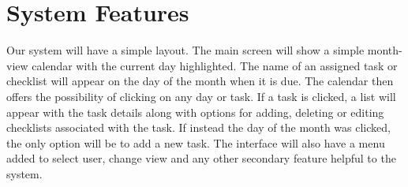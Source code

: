 \documentclass{article}
\begin{document}
\newpage
\section{System Features}
Our system will have a simple layout.
The main screen will show a simple month-view calendar with the current day highlighted. 
The name of an assigned task or checklist will appear on the day of the month when it is due. 
The calendar then offers the possibility of clicking on any day or task.
If a task is clicked, a list will appear with the task details along with options for adding, deleting or editing checklists associated with the task. 
If instead the day of the month was clicked, the only option will be to add a new task. 
The interface will also have a menu added to select user, change view and any other secondary feature helpful to the system.
\end{document}
